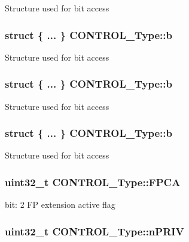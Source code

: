 Structure used for bit access \hypertarget{union_c_o_n_t_r_o_l___type_acacca329e6d291cb2b725f59923cdf27}{
\subsubsection[{b}]{\setlength{\rightskip}{0pt plus 5cm}struct \{ ... \}   C\-O\-N\-T\-R\-O\-L\-\_\-\-Type\-::b}}\label{union_c_o_n_t_r_o_l___type_acacca329e6d291cb2b725f59923cdf27}
Structure used for bit access \hypertarget{union_c_o_n_t_r_o_l___type_acd7a110a4bf4ced749284df57ce2600c}{
\subsubsection[{b}]{\setlength{\rightskip}{0pt plus 5cm}struct \{ ... \}   C\-O\-N\-T\-R\-O\-L\-\_\-\-Type\-::b}}\label{union_c_o_n_t_r_o_l___type_acd7a110a4bf4ced749284df57ce2600c}
Structure used for bit access \hypertarget{union_c_o_n_t_r_o_l___type_aad12faf31357e2fe9f4a1dc51fa1bbcb}{
\subsubsection[{b}]{\setlength{\rightskip}{0pt plus 5cm}struct \{ ... \}   C\-O\-N\-T\-R\-O\-L\-\_\-\-Type\-::b}}\label{union_c_o_n_t_r_o_l___type_aad12faf31357e2fe9f4a1dc51fa1bbcb}
Structure used for bit access \hypertarget{union_c_o_n_t_r_o_l___type_ac62cfff08e6f055e0101785bad7094cd}{
\subsubsection[{F\-P\-C\-A}]{\setlength{\rightskip}{0pt plus 5cm}uint32\-\_\-t C\-O\-N\-T\-R\-O\-L\-\_\-\-Type\-::\-F\-P\-C\-A}}\label{union_c_o_n_t_r_o_l___type_ac62cfff08e6f055e0101785bad7094cd}
bit\-: 2 F\-P extension active flag \hypertarget{union_c_o_n_t_r_o_l___type_a35c1732cf153b7b5c4bd321cf1de9605}{
\subsubsection[{n\-P\-R\-I\-V}]{\setlength{\rightskip}{0pt plus 5cm}uint32\-\_\-t C\-O\-N\-T\-R\-O\-L\-\_\-\-Type\-::n\-P\-R\-I\-V}}\label{union_c_o_n_t_r_o_l___type_a35c1732cf153b7b5c4bd321cf1de9605}
